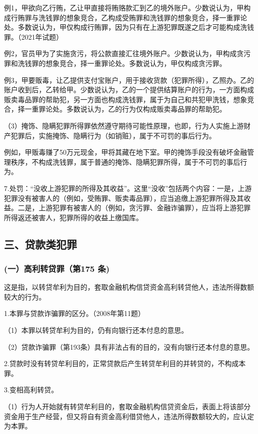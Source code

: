 例1，甲欲向乙行贿，乙让甲直接将贿赂款汇到乙的境外账户。少数说认为，甲构成行贿罪与洗钱罪的想象竞合，乙构成受贿罪和洗钱罪的想象竞合，择一重罪论处。多数说认为，甲仅构成行贿罪，因为只有在上游犯罪既遂之后才可能构成洗钱罪。（2021年试题）

例2，官员甲为了实施贪污，将公款直接汇往境外账户。少数说认为，甲构成贪污罪和洗钱罪的想象竞合，择一重罪论处。多数说认为，甲仅构成贪污罪。

例3，甲要贩毒，让乙提供支付宝账户，用于接收货款（犯罪所得），乙照办。乙的账户收到后，乙转给甲。少数说认为，乙的一个提供结算账户的行为，一方面构成贩卖毒品罪的帮助犯，另一方面也构成洗钱罪，属于为自己和共犯甲洗钱，想象竞合，择一重罪论处。多数说认为，乙的行为仅构成贩卖毒品罪的帮助犯。

（3）掩饰、隐瞒犯罪所得罪依然遵守期待可能性原理，也即，行为人实施上游财产犯罪后，实施掩饰、隐瞒行为（如销赃），属于不可罚的事后行为。

例如，甲贩毒赚了50万元现金，甲将其藏在地下室。甲的掩饰手段没有破坏金融管理秩序，不构成洗钱罪，属于普通的掩饰、隐瞒犯罪所得，属于不可罚的事后行为。

7.处罚：“没收上游犯罪的所得及其收益”。这里“没收”包括两个内容：一是，上游犯罪没有被害人的（例如，受贿罪、贩卖毒品罪），应当追缴上游犯罪所得及其收益。二是，上游犯罪有被害人的（例如，贪污罪、金融诈骗罪），应当将上游犯罪所得返还被害人，犯罪所得的收益上缴国库。

\subsection*{三、贷款类犯罪}

\subsubsection*{(一）高利转贷罪（第175 条)}

这是指，以转贷牟利为目的，套取金融机构信贷资金高利转贷他人，违法所得数额较大的行为。

1.本罪与贷款诈骗罪的区分。（2008年第11题）

（1）本罪以转贷牟利为目的，仍有向银行还本付息的意思。

（2）贷款诈骗罪（第193条）具有非法占有的目的，没有向银行还本付息的意思。

2.贷款时没有转贷牟利目的，正常贷款后产生转贷牟利目的并转贷的，不构成本罪。

3.变相高利转贷。

（1）行为人开始就有转贷牟利目的，套取金融机构信贷资金后，表面上将该部分资金用于生产经营，但又将自有资金高利借贷他人，违法所得数额较大的，应认定为本罪。

